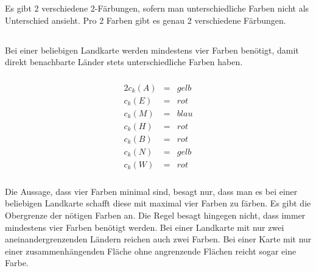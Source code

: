 \documentclass[10pt,a4paper,oneside,ngerman,numbers=noenddot]{scrartcl}
\begin{document}
		\subsubsection{} %
			Es gibt 2 verschiedene 2-Färbungen, sofern man unterschiedliche Farben nicht als Unterschied ansieht. Pro 2 Farben gibt es genau 2 verschiedene Färbungen.
	\subsection{} %
		Bei einer beliebigen Landkarte werden mindestens vier Farben benötigt, damit direkt benachbarte Länder stets unterschiedliche Farben haben.
		\subsubsection{} %
		\subsubsection{} %
			\begin{alignat*}{2}
				c_{k}(A) &=& gelb \\
				c_{k}(E) &=& rot \\
				c_{k}(M) &=& blau \\
				c_{k}(H) &=& rot \\
				c_{k}(B) &=& rot \\
				c_{k}(N) &=& gelb \\
				c_{k}(W) &=& rot
			\end{alignat*}
		\subsubsection{} %
			Die Aussage, dass vier Farben minimal sind, besagt nur, dass man es bei einer beliebigen Landkarte schafft diese mit maximal vier Farben zu färben. Es gibt die Obergrenze der nötigen Farben an. Die Regel besagt hingegen nicht, dass immer mindestens vier Farben benötigt werden. Bei einer Landkarte mit nur zwei aneinandergrenzenden Ländern reichen auch zwei Farben. Bei einer Karte mit nur einer zusammenhängenden Fläche ohne angrenzende Flächen reicht sogar eine Farbe.
\end{document}
